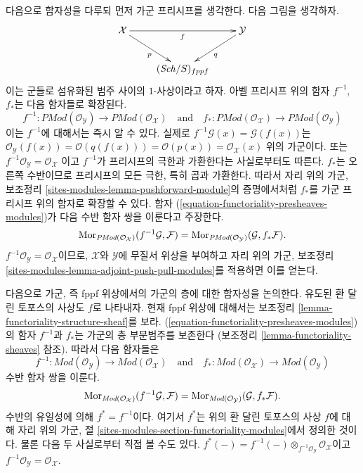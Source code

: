 \medskip\noindent
다음으로 함자성을 다루되 먼저 가군 프리시프를 생각한다. 다음 그림을
생각하자.
$$
\xymatrix{
\mathcal{X} \ar[rr]_f \ar[rd]_p & &  \mathcal{Y} \ar[ld]^q \\
& (\Sch/S)_{fppf}
}
$$
이는 군들로 섬유화된 범주 사이의 $1$-사상이라고 하자.
아벨 프리시프 위의 함자 $f^{-1}$, $f_*$는 다음 함자들로 확장된다.
\begin{equation}
\label{equation-functoriality-presheaves-modules}
f^{-1} :
\textit{PMod}(\mathcal{O}_\mathcal{Y})
\longrightarrow
\textit{PMod}(\mathcal{O}_\mathcal{X})
\quad\text{and}\quad
f_* :
\textit{PMod}(\mathcal{O}_\mathcal{X})
\longrightarrow
\textit{PMod}(\mathcal{O}_\mathcal{Y})
\end{equation}
이는 $f^{-1}$에 대해서는 즉시 알 수 있다. 실제로
$f^{-1}\mathcal{G}(x) = \mathcal{G}(f(x))$는
$\mathcal{O}_\mathcal{Y}(f(x)) = \mathcal{O}(q(f(x))) = \mathcal{O}(p(x)) =
\mathcal{O}_\mathcal{X}(x)$ 위의 가군이다. 또는
$f^{-1}\mathcal{O}_\mathcal{Y} = \mathcal{O}_\mathcal{X}$
이고 $f^{-1}$가 프리시프의 극한과 가환한다는 사실로부터도 따른다.
$f_*$는 오른쪽 수반이므로 프리시프의 모든 극한, 특히 곱과 가환한다.
따라서 자리 위의 가군, 보조정리
\ref{sites-modules-lemma-pushforward-module}의 증명에서처럼
$f_*$를 가군 프리시프 위의 함자로 확장할 수 있다.
함자 (\ref{equation-functoriality-presheaves-modules})가 다음 수반 함자
쌍을 이룬다고 주장한다.
$$
\mathop{\mathrm{Mor}}\nolimits_{\textit{PMod}(\mathcal{O}_\mathcal{X})}(
f^{-1}\mathcal{G}, \mathcal{F})
=
\mathop{\mathrm{Mor}}\nolimits_{\textit{PMod}(\mathcal{O}_\mathcal{Y})}(
\mathcal{G}, f_*\mathcal{F}).
$$
$f^{-1}\mathcal{O}_\mathcal{Y} = \mathcal{O}_\mathcal{X}$이므로,
$\mathcal{X}$와 $\mathcal{Y}$에 무질서 위상을 부여하고 자리 위의 가군,
보조정리 \ref{sites-modules-lemma-adjoint-push-pull-modules}를 적용하면
이를 얻는다.

\medskip\noindent
다음으로 가군, 즉 fppf 위상에서의 가군의 층에 대한 함자성을 논의한다.
유도된 환 달린 토포스의 사상도 $f$로 나타내자. 현재 fppf 위상에
대해서는 보조정리 \ref{lemma-functoriality-structure-sheaf}를 보라.
(\ref{equation-functoriality-presheaves-modules})의 함자
$f^{-1}$과 $f_*$는 가군의 층 부분범주를 보존한다
(보조정리 \ref{lemma-functoriality-sheaves} 참조).
따라서 다음 함자들은
\begin{equation}
\label{equation-functoriality-sheaves-modules}
f^{-1} :
\textit{Mod}(\mathcal{O}_\mathcal{Y})
\longrightarrow
\textit{Mod}(\mathcal{O}_\mathcal{X})
\quad\text{and}\quad
f_* :
\textit{Mod}(\mathcal{O}_\mathcal{X})
\longrightarrow
\textit{Mod}(\mathcal{O}_\mathcal{Y})
\end{equation}
수반 함자 쌍을 이룬다.
$$
\mathop{\mathrm{Mor}}\nolimits_{\textit{Mod}(\mathcal{O}_\mathcal{X})}(
f^{-1}\mathcal{G}, \mathcal{F})
=
\mathop{\mathrm{Mor}}\nolimits_{\textit{Mod}(\mathcal{O}_\mathcal{Y})}(
\mathcal{G}, f_*\mathcal{F}).
$$
수반의 유일성에 의해 $f^* = f^{-1}$이다. 여기서 $f^*$는 위의
환 달린 토포스의 사상 $f$에 대해 자리 위의 가군, 절
\ref{sites-modules-section-functoriality-modules}에서 정의한 것이다.
물론 다음 두 사실로부터 직접 볼 수도 있다.
$f^*(-) = f^{-1}(-) \otimes_{f^{-1}\mathcal{O}_\mathcal{Y}}
\mathcal{O}_\mathcal{X}$이고
$f^{-1}\mathcal{O}_\mathcal{Y} = \mathcal{O}_\mathcal{X}$.

